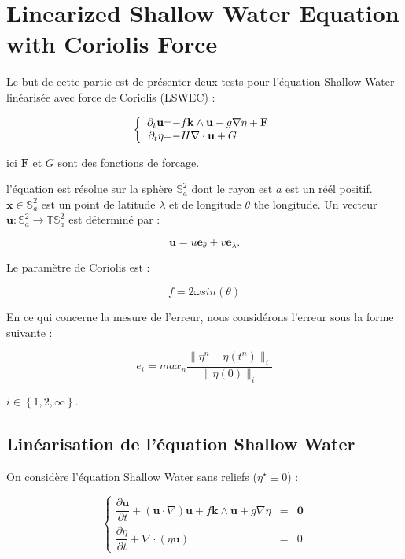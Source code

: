 \chapter{Linearized Shallow Water Equation with Coriolis Force}

Le but de cette partie est de présenter deux tests pour l'équation Shallow-Water linéarisée avec force de Coriolis (LSWEC) :

\begin{equation}
\label{LSWEC}
\left\lbrace
\begin{array}{r @{=} l}
\partial_t \mathbf{u} & -f \mathbf{k} \wedge \mathbf{u} - g \nabla \eta + \mathbf{F} \\
\partial_t \eta & -H \nabla \cdot \mathbf{u} + G
\end{array}
\right.
\end{equation}

ici $\mathbf{F}$ et $G$ sont des fonctions de forcage.

l'équation est résolue sur la sphère $\mathbb{S}_a^2$ dont le rayon est $a$ est un réél positif. $\mathbf{x} \in \mathbb{S}_a^2$ est un point de latitude $\lambda$ et de longitude $\theta$ the longitude. Un vecteur $\mathbf{u} : \mathbb{S}_a^2 \rightarrow \mathbb{T}\mathbb{S}_a^2$ est déterminé par :

$$\mathbf{u} = u \mathbf{e}_{\theta} + v \mathbf{e}_{\lambda}.$$ 

Le paramètre de Coriolis est :

\begin{equation}
f=2 \omega sin ( \theta )
\label{coriolis_parameter}
\end{equation}

En ce qui concerne la mesure de l'erreur, nous considérons l'erreur sous la forme suivante :

$$e_{i} = max_n \dfrac{\| \eta^n - \eta(t^n) \|_{i}}{\| \eta(0) \|_{i}}$$

$i \in \left\lbrace 1, 2, \infty \right\rbrace$.

\section{Linéarisation de l'équation Shallow Water}

On considère l'équation Shallow Water sans reliefs ($\eta^{\star} \equiv 0$) :

\begin{equation}
\label{eq:SWE_without relief}
\left\lbrace
\begin{array}{rcl}
\dfrac{\partial \mathbf{u}}{\partial t} + \left( \mathbf{u} \cdot \nabla \right) \mathbf{u} + f \mathbf{k} \wedge \mathbf{u} + g \nabla \eta & = & \mathbf{0} \\
\dfrac{\partial \eta}{\partial t} + \nabla \cdot \left( \eta \mathbf{u} \right) & = & 0
\end{array}
\right.
\end{equation}

